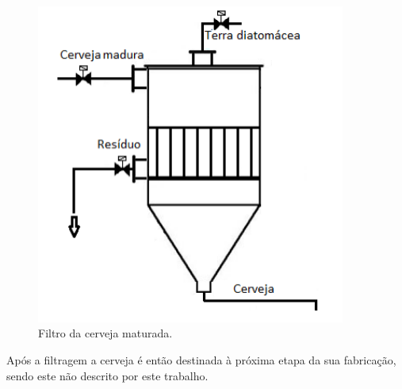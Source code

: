 \documentclass[12pt]{article}
\begin{document}
	\begin{figure}[H]
		\centering
		\includegraphics [width=4in]{filtro.png}
		\caption {Filtro da cerveja maturada.}
		\label{fig:corrente}
	\end{figure}
	
	\begin{par}
		Após a filtragem a cerveja é então destinada à próxima etapa da sua fabricação, sendo este não descrito por este trabalho.
	\end{par}
	
	
\end{document}
